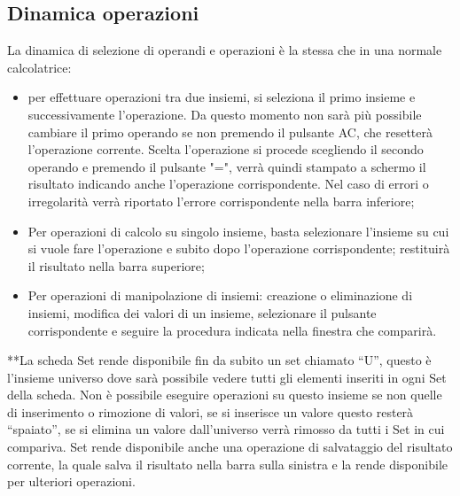 \documentclass[a4paper,10pt]{article}
\begin{document}
        \subsection{Dinamica operazioni}
        La dinamica di selezione di operandi e operazioni è la stessa che in una normale calcolatrice: 
        \begin{itemize}
            \item per effettuare operazioni tra due insiemi, si seleziona il primo insieme e successivamente l’operazione. Da questo momento non sarà più possibile cambiare il primo operando se non premendo il pulsante AC, che resetterà l’operazione corrente. Scelta l’operazione si procede scegliendo il secondo operando e premendo il pulsante "=", verrà quindi stampato a schermo il risultato indicando anche l’operazione corrispondente. Nel caso di errori o irregolarità verrà riportato l’errore corrispondente nella barra inferiore;
            \item Per operazioni di calcolo su singolo insieme, basta selezionare l’insieme su cui si vuole fare l’operazione e subito dopo l’operazione corrispondente; restituirà il risultato nella barra superiore;
            \item Per operazioni di manipolazione di insiemi: creazione o eliminazione di insiemi, modifica dei valori di un insieme, selezionare il pulsante corrispondente e seguire la procedura indicata nella finestra che comparirà.

        \end{itemize}

        **La scheda Set rende disponibile fin da subito un set chiamato “U”, questo è l’insieme universo dove sarà possibile vedere tutti gli elementi inseriti in ogni Set della scheda. Non è possibile eseguire operazioni su questo insieme se non quelle di inserimento o rimozione di valori, se si inserisce un valore questo resterà “spaiato”, se si elimina un valore dall’universo verrà rimosso da tutti i Set in
        cui compariva.
        Set rende disponibile anche una operazione di salvataggio del risultato corrente, la quale salva il risultato
        nella barra sulla sinistra e la rende disponibile per ulteriori operazioni.
\end{document}
